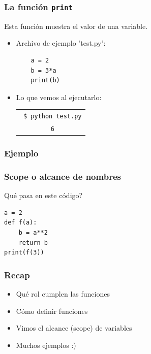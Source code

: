\documentclass[14pt,aspectratio=169,xcolor=dvipsnames]{beamer}
\begin{document}
\begin{frame}[fragile]\frametitle{La función \texttt{print}}
Esta función muestra el valor de una variable. 
\begin{itemize}
    \item Archivo de ejemplo 'test.py':
    \begin{verbatim}
    a = 2
    b = 3*a
    print(b)
    \end{verbatim}
    \item Lo que vemos al ejecutarlo: 
        \begin{tabular}{c}
            \texttt{ \$ python test.py} \\
            \texttt{ 6}
        \end{tabular}
\end{itemize}

\end{frame}
\begin{frame}\frametitle{Ejemplo}
\end{frame}
\begin{frame}[fragile]\frametitle{Scope o alcance de nombres}
Qué pasa en este código?

\begin{verbatim}
a = 2
def f(a):
    b = a**2
    return b
print(f(3))
\end{verbatim}

\end{frame}
\begin{frame}\frametitle{Recap}
    \begin{itemize}
        \item Qué rol cumplen las funciones
        \item Cómo definir funciones
        \item Vimos el alcance (scope) de variables
        \item Muchos ejemplos :)
    \end{itemize}
\end{frame}
\begin{frame}
    \maketitle
\end{frame}
\end{document}
